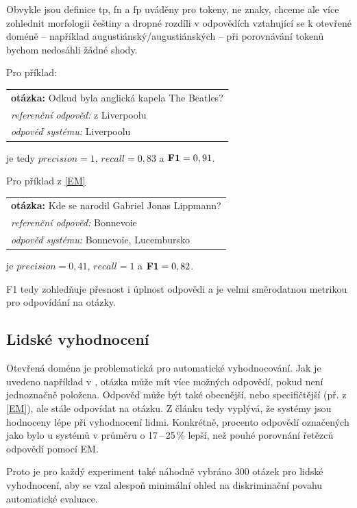 Obvykle jsou definice tp, fn a fp uváděny pro tokeny, ne znaky, chceme ale více zohlednit morfologii češtiny a dropné rozdíli v odpovědích vztahující se k otevřené doméně -- například augustiánský/augustiánských -- při porovnávání tokenů bychom nedosáhli žádné shody.\par \medskip
\noindent Pro příklad: 
\begin{center}
\begin{tabular}{l}
    \textbf{otázka:} Odkud byla anglická kapela The Beatles?\\
    \emph{referenční odpověď:} z Liverpoolu\\
    \emph{odpověď systému:} Liverpoolu\\
\end{tabular}
\end{center}
je tedy $precision = 1$, $recall = 0,83$ a $\text{\textbf{F1}} = 0,91$.\par \medskip
\noindent Pro příklad z \ref{EM}
\begin{center}
\begin{tabular}{l}
    \textbf{otázka:} Kde se narodil Gabriel Jonas Lippmann?\\
    \emph{referenční odpověď:} Bonnevoie\\
    \emph{odpověď systému:} Bonnevoie, Lucembursko\\
\end{tabular}
\end{center}
je $precision = 0,41$, $recall = 1$ a $\text{\textbf{F1}} = 0,82$.\par \medskip
F1 tedy zohledňuje přesnost i úplnost odpovědi a je velmi směrodatnou metrikou pro odpovídání na otázky.

\subsection{Lidské vyhodnocení}
Otevřená doména je problematická pro automatické vyhodnocování. Jak je uvedeno například v \cite{min2021neurips}, otázka může mít více možných odpovědí, pokud není jednoznačně položena. Odpověď může být také obecnější, nebo specifičtější (př. z \ref{EM}), ale stále odpovídat na otázku. Z článku \cite{min2021neurips} tedy vyplývá, že systémy jsou hodnoceny lépe při vyhodnocení lidmi. Konkrétně, procento odpovědí označených jako  bylo u systémů v průměru o 17\,--\,25\,\% lepší, než pouhé porovnání řetězců odpovědí pomocí EM.\par
Proto je pro každý experiment také náhodně vybráno 300 otázek pro lidské vyhodnocení, aby se vzal alespoň minimální ohled na diskriminační povahu automatické evaluace.

